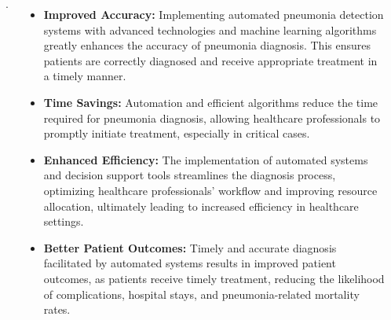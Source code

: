 \documentclass[25pt,a0paper, portrait]{tikzposter}
\begin{document}
\begin{columns}
{{\begin{itemize}
					
					
				\end{itemize}  .
			}
			
			\begin{columns}
				{
					\begin{itemize}
						\item \textbf{Improved Accuracy:} Implementing automated pneumonia detection systems with advanced technologies and machine learning algorithms greatly enhances the accuracy of pneumonia diagnosis. This ensures patients are correctly diagnosed and receive appropriate treatment in a timely manner.
						
						\item \textbf{Time Savings:} Automation and efficient algorithms reduce the time required for pneumonia diagnosis, allowing healthcare professionals to promptly initiate treatment, especially in critical cases.
						
						\item \textbf{Enhanced Efficiency:} The implementation of automated systems and decision support tools streamlines the diagnosis process, optimizing healthcare professionals' workflow and improving resource allocation, ultimately leading to increased efficiency in healthcare settings.
						
						\item \textbf{Better Patient Outcomes:} Timely and accurate diagnosis facilitated by automated systems results in improved patient outcomes, as patients receive timely treatment, reducing the likelihood of complications, hospital stays, and pneumonia-related mortality rates.
						
					\end{itemize}
				}
			\end{columns}
		}
	\end{columns}
	
\end{document}
